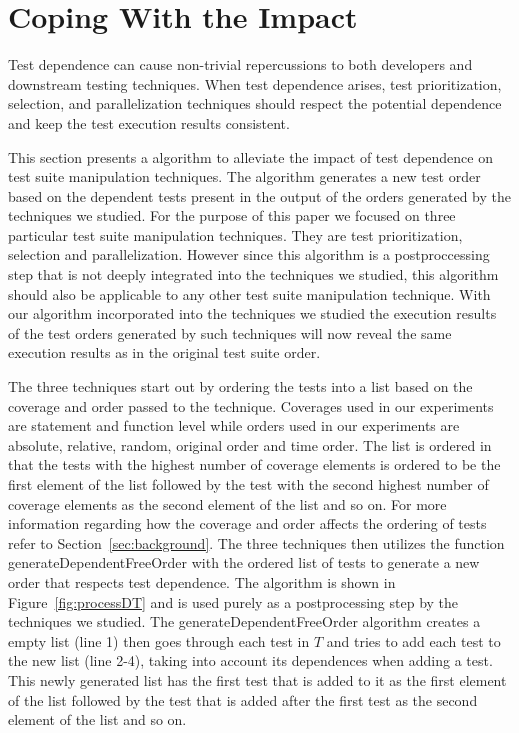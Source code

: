 \section{Coping With the Impact}
\label{sec:cope}

Test dependence can cause non-trivial repercussions
to both developers and downstream testing techniques.
When test dependence arises, test prioritization,
selection, and parallelization techniques
should respect the potential dependence and keep the
test execution results consistent.

This section presents a algorithm to alleviate the
impact of test dependence on test suite manipulation techniques.
The algorithm generates a new test order based on the dependent tests
present in the output of the orders generated by the techniques we studied.
For the purpose of this paper we focused on three particular test suite
manipulation techniques. They are test prioritization, selection
and parallelization.
However since this algorithm is a postproccessing step that is not
deeply integrated into the techniques we studied, this algorithm
should also be applicable to any other test suite manipulation technique.
With our algorithm incorporated into the techniques we studied
the execution results of the test orders generated by such techniques
will now reveal the same execution results as in the original test suite order.


The three techniques start out by ordering the tests into a list 
based on the coverage and order passed to the technique.
Coverages used in our experiments are statement
and function level while orders used in our experiments are absolute,
relative, random, original order and time order. The list is ordered
in that the tests with the highest number of coverage elements
is ordered to be the first element of the list followed by the test with
the second highest number of coverage elements as the second
element of the list and so on. For more information regarding how the coverage
and order affects the ordering of tests refer to Section~\ref{sec:background}.
The three techniques then utilizes the function generateDependentFreeOrder
with the ordered list of tests to generate a new order that respects test dependence.
The algorithm is shown in Figure~\ref{fig:processDT} and is used purely as a
postprocessing step by the techniques we studied.
The generateDependentFreeOrder algorithm creates a empty list (line 1)
then goes through each test in $\mathit{T}$ and tries to add each
test to the new list (line 2-4), taking into account its dependences
when adding a test. This newly generated list has the first test
that is added to it as the first element of the list followed by the
test that is added after the first test as the second element of the list
and so on.


